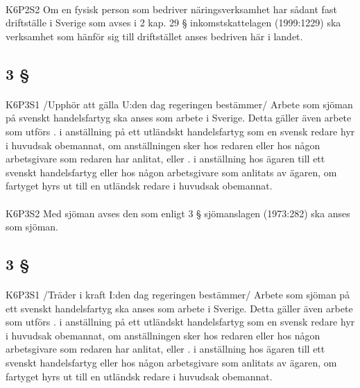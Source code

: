 \documentclass[a4paper,notitlepage,openany,10pt]{book}
\begin{document}
\paragraph*{}
{\tiny K6P2S2}
Om en fysisk person som bedriver näringsverksamhet har sådant fast driftställe i Sverige som avses i 2 kap. 29 § inkomstskattelagen (1999:1229) ska verksamhet som hänför sig till driftstället anses bedriven här i landet.
\subsection*{3 §}
\paragraph*{}
{\tiny K6P3S1}
/Upphör att gälla U:den dag regeringen bestämmer/
Arbete som sjöman på svenskt handelsfartyg ska anses som arbete i Sverige. Detta gäller även arbete som utförs
. i anställning på ett utländskt handelsfartyg som en svensk redare hyr i huvudsak obemannat, om anställningen sker hos redaren eller hos någon arbetsgivare som redaren har anlitat, eller
. i anställning hos ägaren till ett svenskt handelsfartyg eller hos någon arbetsgivare som anlitats av ägaren, om fartyget hyrs ut till en utländsk redare i huvudsak obemannat.
\paragraph*{}
{\tiny K6P3S2}
Med sjöman avses den som enligt 3 § sjömanslagen (1973:282) ska anses som sjöman.
\subsection*{3 §}
\paragraph*{}
{\tiny K6P3S1}
/Träder i kraft I:den dag regeringen bestämmer/
Arbete som sjöman på ett svenskt handelsfartyg ska anses som arbete i Sverige. Detta gäller även arbete som utförs
. i anställning på ett utländskt handelsfartyg som en svensk redare hyr i huvudsak obemannat, om anställningen sker hos redaren eller hos någon arbetsgivare som redaren har anlitat, eller
. i anställning hos ägaren till ett svenskt handelsfartyg eller hos någon arbetsgivare som anlitats av ägaren, om fartyget hyrs ut till en utländsk redare i huvudsak obemannat.
\end{document}
